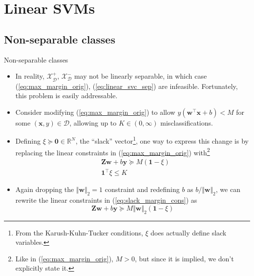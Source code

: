 \documentclass{beamer}
\numberwithin{equation}{section}
\newcommand{\aref}[1]{\alert{\ref{#1}}}
\begin{document}
\section{Linear SVMs}

\subsection{Non-separable classes}

\begin{frame}{Non-separable classes}
    \begin{itemize}
        \item
        In reality, $ \mathcal{X}_\mathcal{D}^+ $,
        $ \mathcal{X}_\mathcal{D}^- $ may not be linearly separable, in which
        case (\aref{eq:max_margin_orig}), (\aref{eq:linear_svc_sep}) are
        infeasible. Fortunately, this problem is easily addressable.

        \item
        Consider modifying (\aref{eq:max_margin_orig}) to allow
        $ y(\mathbf{w}^\top\mathbf{x} + b) < M $ for some $ (\mathbf{x}, y)
        \in \mathcal{D} $, allowing up to $ K \in (0, \infty) $
        misclassifications.

        \item
        Defining $ \xi \succeq \mathbf{0} \in \mathbb{R}^N $, the ``slack''
        vector\footnote{
            From the Karush-Kuhn-Tucker conditions, $ \xi $ does actually
            define slack variables.
        }, one way to express this change is by replacing the linear
        constraints in (\aref{eq:max_margin_orig}) with\footnote{
            Like in (\aref{eq:max_margin_orig}), $ M > 0 $, but since it is
            implied, we don't explicitly state it.
        }
        \begin{equation} \label{eq:slack_margin_cons}
            \begin{split}
                & \mathbf{Zw} + b\mathbf{y} \succeq M(\mathbf{1} - \xi) \\
                & \mathbf{1}^\top\xi \le K
            \end{split}
        \end{equation}

        \item
        Again dropping the $ \Vert\mathbf{w}\Vert_2 = 1 $ constraint and
        redefining $ b $ as $ b / \Vert\mathbf{w}\Vert_2 $, we can rewrite
        the linear constraints in (\aref{eq:slack_margin_cons}) as
        \begin{equation*}
            \mathbf{Zw} + b\mathbf{y} \succeq
            M\Vert\mathbf{w}\Vert_2(\mathbf{1} - \xi)
        \end{equation*}
    \end{itemize}
\end{frame}
\end{document}
